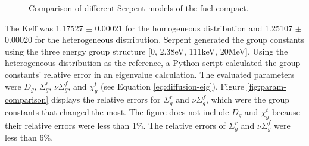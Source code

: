 \begin{figure}[htbp!]
  \centering
  \hfill
  \caption{Comparison of different Serpent models of the fuel compact.}
  \label{fig:compact-model}
\end{figure}

The \gls{Keff} was 1.17527 $\pm$ 0.00021 for the homogeneous distribution and 1.25107 $\pm$ 0.00020 for the heterogeneous distribution.
Serpent generated the group constants using the three energy group structure [0, 2.38eV, 111keV, 20MeV].
Using the heterogeneous distribution as the reference, a Python script calculated the group constants' relative error in an eigenvalue calculation.
The evaluated parameters were $D_g$, $\Sigma^r_g$, $\nu\Sigma^f_g$, and $\chi^t_g$ (see Equation \ref{eq:diffusion-eig}).
Figure \ref{fig:param-comparison} displays the relative errors for $\Sigma^r_g$ and $\nu\Sigma^f_g$, which were the group constants that changed the most.
The figure does not include $D_g$ and $\chi^t_g$ because their relative errors were less than 1$\%$.
The relative errors of $\Sigma^r_g$ and $\nu\Sigma^f_g$ were less than 6$\%$.

